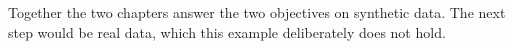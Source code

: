Together the two chapters answer the two objectives on synthetic data. The
next step would be real data, which this example deliberately does not hold.
